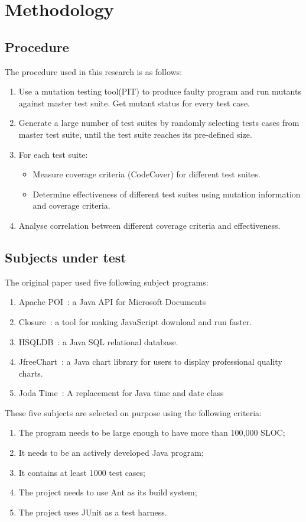 \section{Methodology}
\subsection{Procedure}
The procedure used in this research is as follows:
\begin{enumerate}
	\item Use a mutation testing tool(PIT) to produce faulty program and run mutants against master test suite. Get mutant status for every test case.
	\item Generate a large number of test suites by randomly selecting tests cases from master test suite, until the test suite reaches its pre-defined size.
	\item For each test suite:
	\begin{itemize}
		\item Measure coverage criteria (CodeCover) for different test suites.
		\item Determine effectiveness of different test suites using mutation information and coverage criteria.
	\end{itemize}
	\item Analyse correlation between different coverage criteria and effectiveness.
\end{enumerate}

\subsection{Subjects under test}
The original paper used five following subject programs: 
\begin{enumerate}
	\item Apache POI~\cite{apachepoi}: a Java API for Microsoft Documents
	\item Closure~\cite{closure}: a tool for making JavaScript download and run faster.
	\item HSQLDB~\cite{hsqldb}: a Java SQL relational database.
	\item JfreeChart~\cite{jfreechart}: a Java chart library for users to display professional quality charts.
	\item Joda Time~\cite{jodatime}: A replacement for Java time and date class
\end{enumerate}

These five subjects are selected on purpose using the following criteria:
\begin{enumerate}
	\item The program needs to be large enough to have more than 100,000 SLOC;
	\item It needs to be an actively developed Java program;
	\item It contains at least 1000 test cases;
	\item The project needs to use Ant as its build system;
	\item The project uses JUnit as a test harness.
\end{enumerate}

